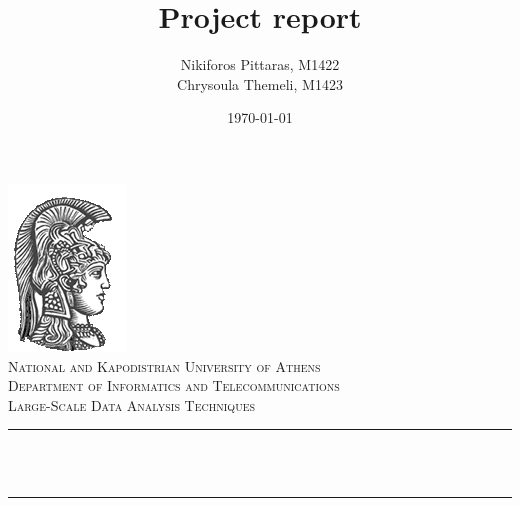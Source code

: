\documentclass[12pt]{article}
\title{Project report}   %
\author{ Nikiforos Pittaras, M1422 \\ 
		 Chrysoula Themeli, M1423}                               %
\date{\today}  %
\makeatletter
\let\thetitle\@title
\let\theauthor\@author
\let\thedate\@date
\makeatother
\begin{document}
	
	
	\begin{titlepage}
		\centering
		\vspace*{0.5 cm}
		\includegraphics[scale = 0.75]{ekpalogo.png}\\[1.0 cm]   %
		\textsc{\LARGE National and Kapodistrian University of Athens}\\[2.0 cm]   %
		\textsc{\Large Department of Informatics and Telecommunications}\\[0.5 cm]               %
		\textsc{\large Large-Scale Data Analysis Techniques}\\[0.5 cm] %
		\rule{\linewidth}{0.2 mm} \\[0.4 cm]
		{ \huge \bfseries \thetitle}\\
		\rule{\linewidth}{0.2 mm} \\[1.5 cm]
		
		\begin{minipage}{0.4\textwidth}
			\begin{center} \large
				\theauthor
			\end{center}
		\end{minipage}~
		\begin{minipage}{0.4\textwidth}
		\end{minipage}\\[2 cm]
		
		{\large \thedate}\\[2 cm]
		
		\vfill
		
	\end{titlepage}
	
	
	\tableofcontents
    \newpage
	\listoffigures
	\newpage
	\listoftodos
	\newpage
	
\end{document}
